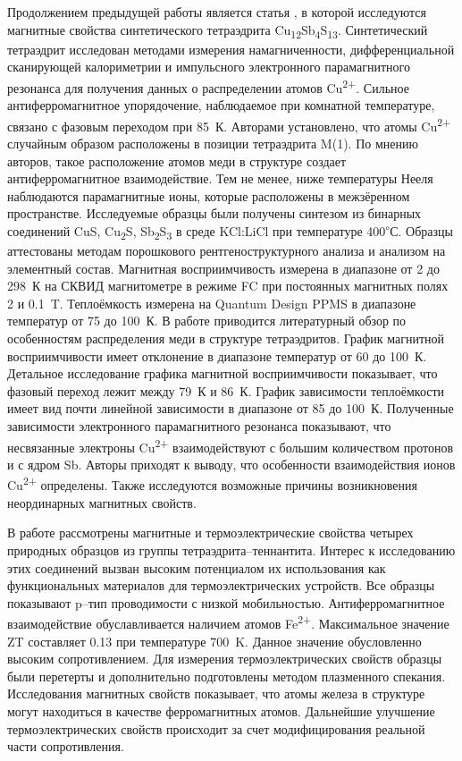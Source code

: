 Продолжением предыдущей работы является статья \cite{DiBenedetto2005}, в которой исследуются магнитные свойства синтетического тетраэдрита Cu\textsubscript{12}Sb\textsubscript{4}S\textsubscript{13}. Синтетический тетраэдрит исследован методами измерения намагниченности, дифференциальной сканирующей калориметрии и импульсного электронного парамагнитного резонанса для получения данных о распределении атомов Cu\textsuperscript{2+}.
Сильное антиферромагнитное упорядочение, наблюдаемое при комнатной температуре, связано с фазовым переходом при 85~К. Авторами установлено, что атомы Cu\textsuperscript{2+} случайным образом расположены в позиции тетраэдрита M(1). По мнению авторов, такое расположение атомов меди в структуре создает антиферромагнитное взаимодействие. Тем не менее, ниже температуры Нееля наблюдаются парамагнитные ионы, которые расположены в межзёренном пространстве. Исследуемые образцы были получены синтезом из бинарных соединений CuS, Cu\textsubscript{2}S, Sb\textsubscript{2}S\textsubscript{3} в среде KCl:LiCl при температуре 400\textsuperscript{$\circ$}С. Образцы аттестованы методам порошкового рентгеноструктурного анализа и анализом на элементный состав. Магнитная восприимчивость измерена в диапазоне от 2 до 298~К на СКВИД магнитометре в режиме FC при постоянных магнитных полях 2 и 0.1~T. Теплоёмкость измерена на Quantum Design
PPMS в диапазоне температур от 75 до 100~К. В работе приводится литературный обзор по особенностям распределения меди в структуре тетраэдритов. График магнитной восприимчивости имеет отклонение в диапазоне температур от 60 до 100~К. Детальное исследование графика магнитной восприимчивости показывает, что фазовый переход лежит между 79~К и 86~К. График зависимости теплоёмкости имеет вид почти линейной зависимости в диапазоне от 85 до 100~К. Полученные зависимости электронного парамагнитного резонанса показывают, что несвязанные электроны Cu\textsuperscript{2+} взаимодействуют с большим количеством протонов и с ядром Sb. Авторы приходят к выводу, что особенности взаимодействия ионов Cu\textsuperscript{2+} определены. Также исследуются возможные причины возникновения неординарных магнитных свойств.



В работе \cite{Levinsky_2015} рассмотрены магнитные и термоэлектрические свойства четырех природных образцов из группы тетраэдрита--теннантита. Интерес к исследованию этих соединений вызван высоким потенциалом их использования как функциональных материалов для термоэлектрических устройств. Все образцы показывают p--тип проводимости с низкой мобильностью. Антиферромагнитное взаимодействие обуславливается наличием атомов Fe\textsuperscript{2+}. Максимальное значение ZT составляет 0.13 при температуре 700~K. Данное значение обусловленно высоким сопротивлением. Для измерения термоэлектрических свойств образцы были перетерты и дополнительно подготовлены методом плазменного спекания. Исследования магнитных свойств показывает, что  атомы железа в структуре могут находиться в качестве ферромагнитных атомов. Дальнейшие улучшение термоэлектрических свойств происходит за счет модифицирования реальной части сопротивления.

